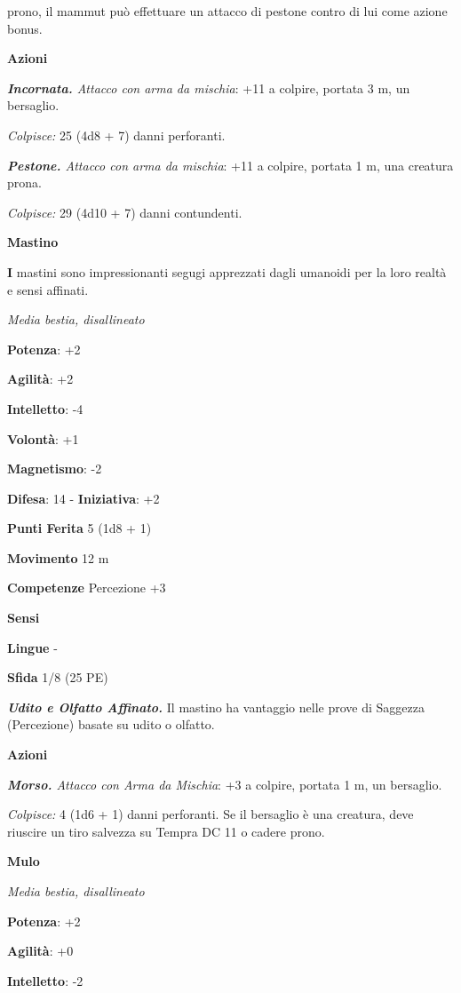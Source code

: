 \begin{multicols}{2}
prono, il mammut può effettuare un attacco di pestone contro di lui come
azione bonus.

\smallskip\textbf{Azioni}

\emph{\textbf{Incornata.} Attacco con arma da mischia}: +11 a colpire,
portata 3 m, un bersaglio.

\emph{Colpisce:} 25 (4d8 + 7) danni perforanti.

\emph{\textbf{Pestone.} Attacco con arma da mischia}: +11 a colpire,
portata 1 m, una creatura prona.

\emph{Colpisce:} 29 (4d10 + 7) danni contundenti.

\textbf{Mastino}

\textbf{I} mastini sono impressionanti segugi apprezzati dagli umanoidi
per la loro realtà e sensi affinati.

\emph{Media bestia, disallineato}

\textbf{Potenza}: +2

\textbf{Agilità}: +2

\textbf{Intelletto}: -4

\textbf{Volontà}: +1

\textbf{Magnetismo}: -2

\textbf{Difesa}: 14 - \textbf{Iniziativa}: +2

\textbf{Punti Ferita} 5 (1d8 + 1)

\textbf{Movimento} 12 m

\textbf{Competenze} Percezione +3

\textbf{Sensi} 

\textbf{Lingue} -

\textbf{Sfida} 1/8 (25 PE)\smallskip

\emph{\textbf{Udito e Olfatto Affinato.}} Il mastino ha vantaggio nelle
prove di Saggezza (Percezione) basate su udito o olfatto.

\smallskip\textbf{Azioni}

\emph{\textbf{Morso.} Attacco con Arma da Mischia}: +3 a colpire,
portata 1 m, un bersaglio.

\emph{Colpisce:} 4 (1d6 + 1) danni perforanti. Se il bersaglio è una
creatura, deve riuscire un tiro salvezza su Tempra DC 11 o cadere prono.

\textbf{Mulo}

\emph{Media bestia, disallineato}

\textbf{Potenza}: +2

\textbf{Agilità}: +0

\textbf{Intelletto}: -2


\end{multicols}
